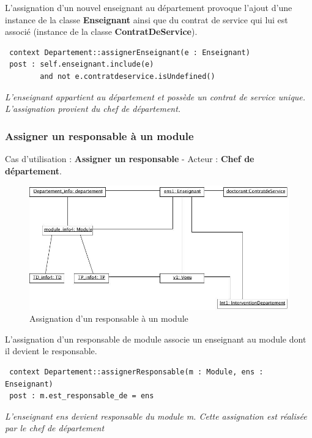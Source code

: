  \indent L'assignation d'un nouvel enseignant au département provoque l'ajout d'une instance de la classe \textbf{Enseignant} ainsi que du contrat de service qui lui est associé (instance de la classe \textbf{ContratDeService}).

 \begin{verbatim}
 context Departement::assignerEnseignant(e : Enseignant)
 post : self.enseignant.include(e)
        and not e.contratdeservice.isUndefined()
 \end{verbatim}
 \emph{L'enseignant appartient au département et possède un contrat de service unique. L'assignation provient du chef de département.}







 \subsubsection{Assigner un responsable à un module}
 \indent Cas d'utilisation : \textbf{Assigner un responsable} - Acteur : \textbf{Chef de département}.

 \begin{figure}[!htbp]
 \begin{center}
 \includegraphics[width=12cm]{fig/4-ResponsableModule.jpg}
 \caption{Assignation d'un responsable à un module}
 \end{center}
 \end{figure}

 \indent L'assignation d'un responsable de module associe un enseignant au module dont il devient le responsable.

 \begin{verbatim}
 context Departement::assignerResponsable(m : Module, ens : Enseignant)
 post : m.est_responsable_de = ens
 \end{verbatim}
 \emph{L'enseignant ens devient responsable du module m. Cette assignation est réalisée par le chef de département}


